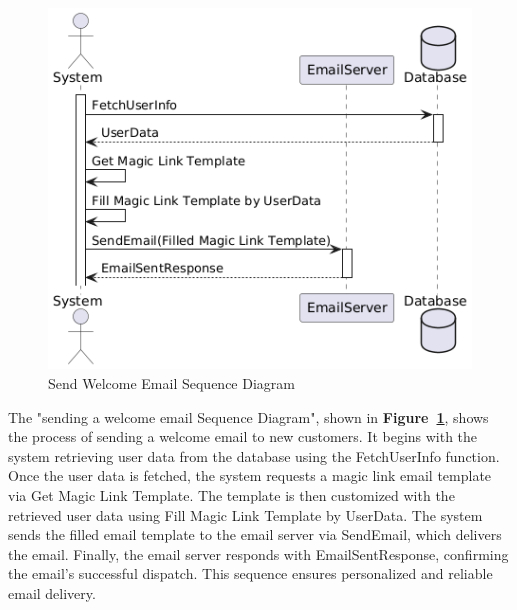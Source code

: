 \begin{figure}[!h]
  \centering
  \includegraphics[width=\textwidth]{images/docs/diagrams/sequence-diagrams/all-sequence-diagrams/Send Welcome Email.png}
  \caption{Send Welcome Email Sequence Diagram}
  \label{fig:seq/send-welcome-email}
\end{figure}

The "sending a welcome email Sequence Diagram", shown in \textbf{Figure~\ref{fig:seq/send-welcome-email}}, shows the process of sending a welcome email to new customers. It begins with the system retrieving user data from the database using the FetchUserInfo function. Once the user data is fetched, the system requests a magic link email template via Get Magic Link Template. The template is then customized with the retrieved user data using Fill Magic Link Template by UserData. The system sends the filled email template to the email server via SendEmail, which delivers the email. Finally, the email server responds with EmailSentResponse, confirming the email's successful dispatch. This sequence ensures personalized and reliable email delivery.

